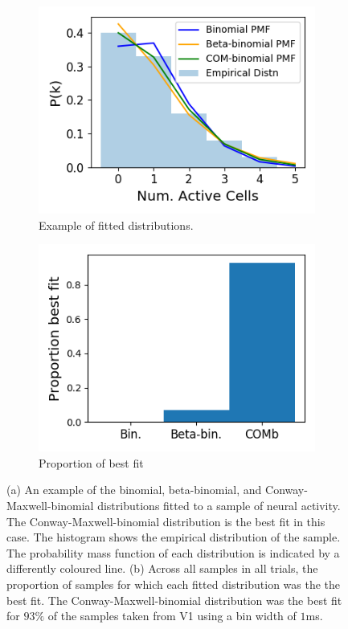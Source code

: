 \documentclass[a4paper,12pt]{article}
\theoremstyle{definition}
\begin{document}
  \begin{figure}[h]
    \begin{subfigure}[h]{0.5\linewidth}
      \includegraphics[width=\linewidth]{figures/fitting_example.png}
      \caption{Example of fitted distributions.}
      \label{fig:fitting_example}
    \end{subfigure}
    \begin{subfigure}[h]{0.5\linewidth}
      \includegraphics[width=\linewidth]{figures/best_fit_proportion.png}
      \caption{Proportion of best fit}
      \label{fig:best_fit_proportion}
    \end{subfigure}
    \caption{(a) An example of the binomial, beta-binomial, and Conway-Maxwell-binomial distributions fitted to a sample of neural activity. The Conway-Maxwell-binomial distribution is the best fit in this case. The histogram shows the empirical distribution of the sample. The probability mass function of each distribution is indicated by a differently coloured line. (b) Across all samples in all trials, the proportion of samples for which each fitted distribution was the the best fit. The Conway-Maxwell-binomial distribution was the best fit for $93\%$ of the samples taken from V1 using a bin width of $1$ms.}
    \label{fig:fitting}
  \end{figure}
\end{document}
